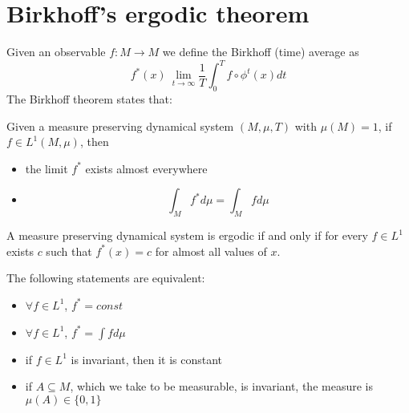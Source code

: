 \section{Birkhoff's ergodic theorem}
Given an observable $f:M\rightarrow M$ we define the Birkhoff (time) average as
$$
	f^*(x) \ \lim_{t\rightarrow \infty} \frac{1}{T}\int_0^T f\circ \phi^t(x)dt
$$
The Birkhoff theorem states that:
\begin{prop}
	Given a measure preserving dynamical system $(M,\mu,T)$ with $\mu(M)=1$, if $f\in L^1(M,\mu)$, then 
	\begin{itemize}
		\item the limit $f^*$ exists almost everywhere
		\item 
			$$
				\int_M f^* d\mu = \int_M f d\mu
			$$
	\end{itemize}
\end{prop}
\begin{definition}
	A measure preserving dynamical system is ergodic if and only if for every $f\in L^1$ exists $c$ such that $f^*(x) = c$ for almost all values of $x$. 
\end{definition}
\begin{prop}
	The following statements are equivalent:
	\begin{itemize}
		\item $\forall f\in L^1$, $f^* = const$	
		\item $\forall f\in L^1$, $f^* = \int f d\mu$
		\item if $f \in L^1$ is invariant, then it is constant
		\item if $A \subseteq M$, which we take to be measurable, is invariant, the measure is $\mu(A) \in \{0,1\}$
	\end{itemize}
\end{prop}
